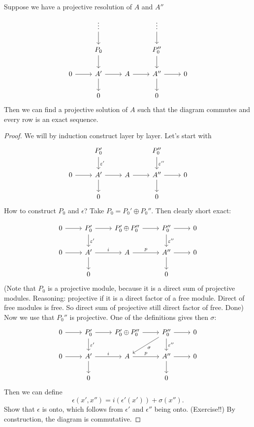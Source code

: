 \begin{lemma}
    Suppose we have a projective resolution of $A$ and $A''$
    \[
        \begin{tikzcd}
            & \vdots \arrow[d, ""] & & \vdots \arrow[d, ""] &\\
            & P_0 \arrow[d, ""] & & P_0'' \arrow[d, ""]&\\
            0 \arrow[r, ""] & A'\arrow[d, ""] \arrow[r, " "] & A \arrow[r, " "] &A''\arrow[d, ""]   \arrow[r, ""] &0 \\
                            & 0 & & 0 &
        \end{tikzcd}
    \]
    Then we can find a projective solution of $A$ such that the diagram commutes and every row is an exact sequence.
\end{lemma}
\begin{proof}
    We will by induction construct layer by layer.
    Let's start with
    \[
        \begin{tikzcd}
            & P_0' \arrow[d, "\epsilon'"] & & P_0'' \arrow[d, "\epsilon''"]\\
            0 \arrow[r, ""] & A'\arrow[d, ""] \arrow[r, ""] & A \arrow[r, ""] & A'' \arrow[d, ""]\arrow[r, ""] & 0\\
                            & 0 & & 0 &
        \end{tikzcd}
    \]
    How to construct $P_0$ and $\epsilon$?
    Take  $ P_0 = P_0' \oplus P_0''$. Then clearly short exact:

    \[
        \begin{tikzcd}
            0 \arrow[r, ""]& P_0' \arrow[r, ""]\arrow[d, "\epsilon'"] & P_0' \oplus P_0'' \arrow[r, " "]& P_0'' \arrow[d, "\epsilon''"] \arrow[r, ""] & 0\\
            0 \arrow[r, ""] & A'\arrow[d, ""] \arrow[r, "i"] & A \arrow[r, "p"] & A'' \arrow[d, ""]\arrow[r, ""] & 0\\
                            & 0 & & 0 &
        \end{tikzcd}
    \]
    (Note that $ P_0$ is a projective module, because it is a direct sum of projective modules. Reasoning: projective if it is a direct factor of a free module. Direct of free modules is free. So direct sum of projective still direct factor of free. Done)
    Now we use that $ P_0''$ is projective. One of the definitions gives then $\sigma$:
    \[
        \begin{tikzcd}
            0 \arrow[r, ""]& P_0' \arrow[r, ""]\arrow[d, "\epsilon'"] & P_0' \oplus P_0'' \arrow[r, " "]& P_0'' \arrow[d, "\epsilon''"] \arrow[r, ""]\arrow[dl, "\sigma"] & 0\\
            0 \arrow[r, ""] & A'\arrow[d, ""] \arrow[r, "i"] & A \arrow[r, "p"] & A'' \arrow[d, ""]\arrow[r, ""] & 0\\
                            & 0 & & 0 &
        \end{tikzcd}
    \]
    Then we can define
    \[
        \epsilon(x', x'') = i(\epsilon'(x')) + \sigma(x'')
    .\] 
    Show that $\epsilon$ is onto, which follows from $\epsilon'$ and $\epsilon''$ being onto. (Exercise!!)
    By construction, the diagram is commutative.


\end{proof}
